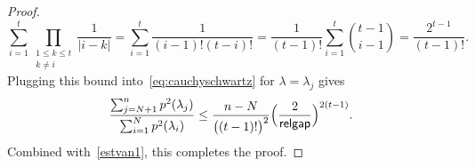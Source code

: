 \documentclass{siamart190516}
\newcommand{\gap}{\mathsf{relgap}}
\providecommand{\abs}[1]{\lvert#1\rvert}
\begin{document}
\begin{proof}
    \begin{equation*}
        \sum_{i=1}^{t}\prod_{\substack{1\leq k\leq t\\ k\neq i}}\frac{1}{\abs{i-k}}=\sum_{i=1}^{t}\frac{1}{(i-1)!(t-i)!}=\frac{1}{(t-1)!}\sum_{i=1}^{t} \binom{t-1}{i-1} =\frac{2^{t-1}}{(t-1)!}.
    \end{equation*}
    Plugging this bound into~\eqref{eq:cauchyschwartz} for $\lambda = \lambda_j$ gives
    \begin{equation*}
        \begin{aligned}
            \frac{\sum_{j=N+1}^{n}p^{2}(\lambda_{j})}{\sum_{i=1}^{N}p^{2}(\lambda_{i})}\leq \frac{n-N}{\bigl((t-1)!\bigr)^{2}}\Bigl(\frac{2}{\gap}\Bigr)^{2(t-1)}.
        \end{aligned}
    \end{equation*}
    Combined with~\cref{estvan1}, this completes the proof.
\end{proof}
\end{document}
